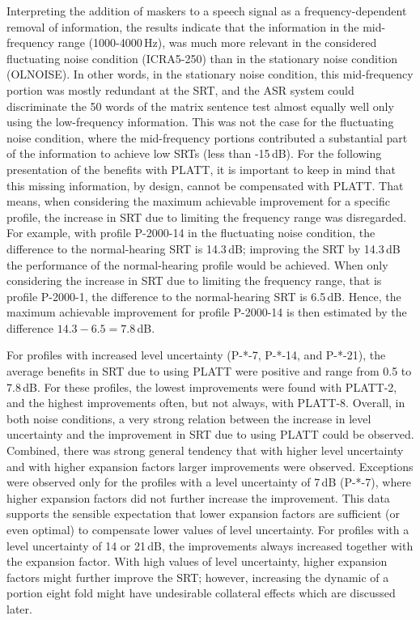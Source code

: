 \documentclass[10pt,a4paper,twocolumn]{article}
\begin{document}
Interpreting the addition of maskers to a speech signal as a frequency-dependent removal of information, the results indicate that the information in the mid-frequency range (1000-4000\,Hz), was much more relevant in the considered fluctuating noise condition (ICRA5-250) than in the stationary noise condition (OLNOISE).
%
In other words, in the stationary noise condition, this mid-frequency portion was mostly redundant at the SRT, and the ASR system could discriminate the 50 words of the matrix sentence test almost equally well only using the low-frequency information.
%
This was not the case for the fluctuating noise condition, where the mid-frequency portions contributed a substantial part of the information to achieve low SRTs (less than -15\,dB).
%
For the following presentation of the benefits with PLATT, it is important to keep in mind that this missing information, by design, cannot be compensated with PLATT.
%
That means, when considering the maximum achievable improvement for a specific profile, the increase in SRT due to limiting the frequency range was disregarded.
%
For example, with profile P-2000-14 in the fluctuating noise condition, the difference to the normal-hearing SRT is 14.3\,dB; improving the SRT by 14.3\,dB the performance of the normal-hearing profile would be achieved.
%
When only considering the increase in SRT due to limiting the frequency range, that is profile P-2000-1, the difference to the normal-hearing SRT is 6.5\,dB.
%
Hence, the maximum achievable improvement for profile P-2000-14 is then estimated by the difference $14.3-6.5=7.8$\,dB.

For profiles with increased level uncertainty (P-*-7, P-*-14, and P-*-21), the average benefits in SRT due to using PLATT were positive and range from 0.5 to 7.8\,dB.
%
For these profiles, the lowest improvements were found with PLATT-2, and the highest improvements often, but not always, with PLATT-8.
%
Overall, in both noise conditions, a very strong relation between the increase in level uncertainty and the improvement in SRT due to using PLATT could be observed.
%
Combined, there was strong general tendency that with higher level uncertainty and with higher expansion factors larger improvements were observed.
%
Exceptions were observed only for the profiles with a level uncertainty of 7\,dB (P-*-7), where higher expansion factors did not further increase the improvement.
%
This data supports the sensible expectation that lower expansion factors are sufficient (or even optimal) to compensate lower values of level uncertainty.
%
For profiles with a level uncertainty of 14 or 21\,dB, the improvements always increased together with the expansion factor.
%
With high values of level uncertainty, higher expansion factors might further improve the SRT; however, increasing the dynamic of a portion eight fold might have undesirable collateral effects which are discussed later.
\end{document}
